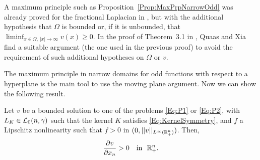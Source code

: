 \begin{remark}
	A maximum principle such as Proposition~\ref{Prop:MaxPrpNarrowOdd} was already proved for the fractional Laplacian in \cite{ChenLiLi}, but with the additional hypothesis that $\Omega$ is bounded or, if it is unbounded, that $\liminf_{x\in  \Omega,\ |x|\to \infty} v(x) \geq 0$. In the proof of Theorem~3.1 in \cite{QuaasXia}, Quaas and Xia find a suitable argument (the one used in the previous proof) to avoid the requirement of such additional hypotheses on $\Omega$ or $v$.
\end{remark}

The maximum principle in narrow domains for odd functions with respect to a hyperplane is the main tool to use the moving plane argument. Now we can show the following result.

\begin{proposition}
	\label{Prop:MonotonyHalfSpace}
	Let $v$ be a bounded solution to one of the problems \eqref{Eq:P1} or \eqref{Eq:P2}, with $L_K \in \mathcal{L}_0(n,\gamma)$ such that the kernel $K$ satisfies \eqref{Eq:KernelSymmetry}, and $f$ a Lipschitz nonlinearity such that $f>0$ in $(0,||v||_{L^\infty(\mathbb{R}^n_+)})$. Then,
	$$
	\frac{\partial v}{\partial x_n} > 0 \,\,\,\, \text{ in } \,\,\mathbb{R}^n_+.
	$$
\end{proposition}


